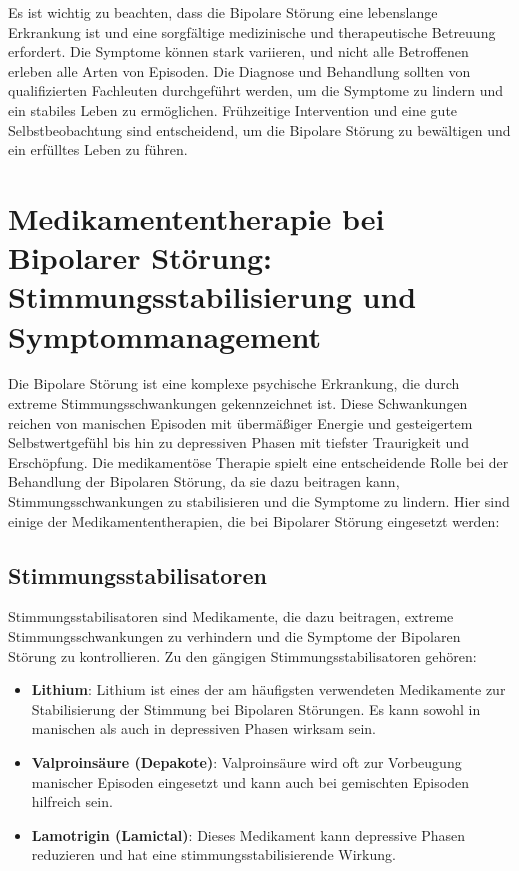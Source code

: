 Es ist wichtig zu beachten, dass die Bipolare Störung eine lebenslange Erkrankung ist und eine sorgfältige medizinische und therapeutische Betreuung erfordert. Die Symptome können stark variieren, und nicht alle Betroffenen erleben alle Arten von Episoden. Die Diagnose und Behandlung sollten von qualifizierten Fachleuten durchgeführt werden, um die Symptome zu lindern und ein stabiles Leben zu ermöglichen. Frühzeitige Intervention und eine gute Selbstbeobachtung sind entscheidend, um die Bipolare Störung zu bewältigen und ein erfülltes Leben zu führen.
\section{Medikamententherapie bei Bipolarer Störung: Stimmungsstabilisierung und Symptommanagement}

Die Bipolare Störung ist eine komplexe psychische Erkrankung, die durch extreme Stimmungsschwankungen gekennzeichnet ist. Diese Schwankungen reichen von manischen Episoden mit übermäßiger Energie und gesteigertem Selbstwertgefühl bis hin zu depressiven Phasen mit tiefster Traurigkeit und Erschöpfung. Die medikamentöse Therapie spielt eine entscheidende Rolle bei der Behandlung der Bipolaren Störung, da sie dazu beitragen kann, Stimmungsschwankungen zu stabilisieren und die Symptome zu lindern. Hier sind einige der Medikamententherapien, die bei Bipolarer Störung eingesetzt werden:

\subsection{Stimmungsstabilisatoren}

Stimmungsstabilisatoren sind Medikamente, die dazu beitragen, extreme Stimmungsschwankungen zu verhindern und die Symptome der Bipolaren Störung zu kontrollieren. Zu den gängigen Stimmungsstabilisatoren gehören:

\begin{itemize}
\item \textbf{Lithium}: Lithium ist eines der am häufigsten verwendeten Medikamente zur Stabilisierung der Stimmung bei Bipolaren Störungen. Es kann sowohl in manischen als auch in depressiven Phasen wirksam sein.

\item \textbf{Valproinsäure (Depakote)}: Valproinsäure wird oft zur Vorbeugung manischer Episoden eingesetzt und kann auch bei gemischten Episoden hilfreich sein.

\item \textbf{Lamotrigin (Lamictal)}: Dieses Medikament kann depressive Phasen reduzieren und hat eine stimmungsstabilisierende Wirkung.
\end{itemize}

